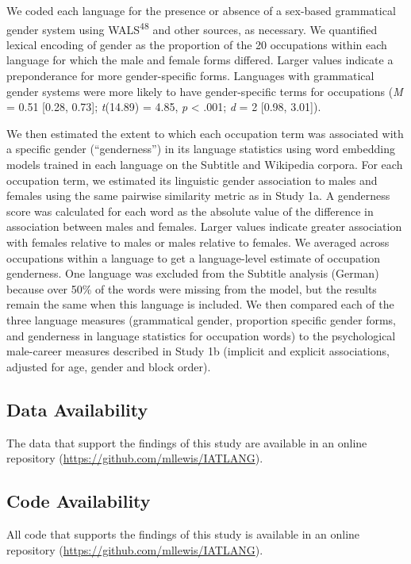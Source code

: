 \documentclass[11pt]{wlscirep}
\begin{document}
We coded each language for the presence or absence of a sex-based grammatical gender system using WALS\textsuperscript{48} and other sources, as necessary. We quantified lexical encoding of gender as the proportion of the 20 occupations within each language for which the male and female forms differed. Larger values indicate a preponderance for more gender-specific forms.  Languages with grammatical gender systems were more likely to have gender-specific terms for occupations
(\emph{M} = 0.51 {[}0.28, 0.73{]}; \emph{t}(14.89) = 4.85, \emph{p} \textless{} .001; \emph{d} = 2 {[}0.98, 3.01{]}). 

We then estimated the extent to which each occupation term was associated with a specific gender (``genderness'')  in its language statistics using word
embedding models trained in each language on the Subtitle and Wikipedia
corpora. For each occupation term, we estimated its linguistic gender association to males and females using the same pairwise similarity metric as in Study 1a. A genderness score was calculated for each word as the absolute value of the difference in association between males and females.  Larger values indicate greater association with females relative to males or males relative to females. We averaged across occupations within a language to get a
language-level estimate of occupation genderness. One language was excluded from the Subtitle analysis (German) because over 50\% of the words were missing from the model, but the results remain the same when this language is included.  We then compared each of the three
language measures (grammatical gender, proportion specific gender forms,
and genderness in language statistics for occupation words) to the
psychological male-career measures described in Study 1b (implicit and
explicit associations, adjusted for age, gender and block order).


\subsection*{Data Availability}

The data that support the findings of this study are available in an online repository (\url{https://github.com/mllewis/IATLANG}). 

\subsection*{Code Availability}
All code that supports the findings of this study is available in an online repository (\url{https://github.com/mllewis/IATLANG}).
\end{document}
